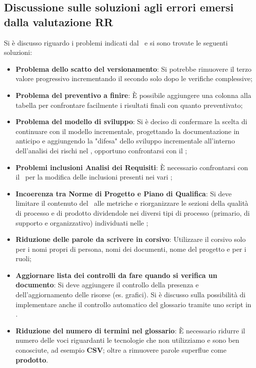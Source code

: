 \subsection{Discussione sulle soluzioni agli errori emersi dalla valutazione RR}
Si è discusso riguardo i problemi indicati dal \VT\ e si sono trovate le seguenti soluzioni:
\begin{itemize}
	\item \textbf{Problema dello scatto del versionamento}: Si potrebbe rimuovere il terzo valore progressivo incrementando il secondo solo dopo le verifiche complessive;
	\item \textbf{Problema del preventivo a finire}: È possibile aggiungere una colonna alla tabella per confrontare facilmente i risultati finali con quanto preventivato;
	\item \textbf{Problema del modello di sviluppo}: Si è deciso di confermare la scelta di continuare con il modello incrementale, progettando la documentazione in anticipo e aggiungendo la "difesa" dello sviluppo incrementale all'interno dell'analisi dei rischi nel \PdP, opportuno confrontarsi con il \VT;
	\item \textbf{Problemi inclusioni Analisi dei Requisiti}: È necessario confrontarsi con il \CR\ per la modifica delle inclusioni presenti nei vari ;
	\item \textbf{Incoerenza tra Norme di Progetto e Piano di Qualifica}: Si deve limitare il contenuto del \PdQ\ alle metriche e riorganizzare le sezioni della qualità di processo e di prodotto dividendole nei diversi tipi di processo (primario, di supporto e organizzativo) individuati nelle \NdP;
	\item \textbf{Riduzione delle parole da scrivere in corsivo}: Utilizzare il corsivo solo per i nomi propri di persona, nomi dei documenti, nome del progetto e per i ruoli;
	\item \textbf{Aggiornare lista dei controlli da fare quando si verifica un documento}: Si deve aggiungere il controllo della presenza e dell'aggiornamento delle risorse (es. grafici). Si è discusso sulla possibilità di implementare anche il controllo automatico del glossario tramite uno script in .
	\item \textbf{Riduzione del numero di termini nel glossario}: È necessario ridurre il numero delle voci riguardanti le tecnologie che non utilizziamo e sono ben conosciute, ad esempio \textbf{CSV}; oltre a rimuovere parole superflue come \textbf{prodotto}.
\end{itemize}
